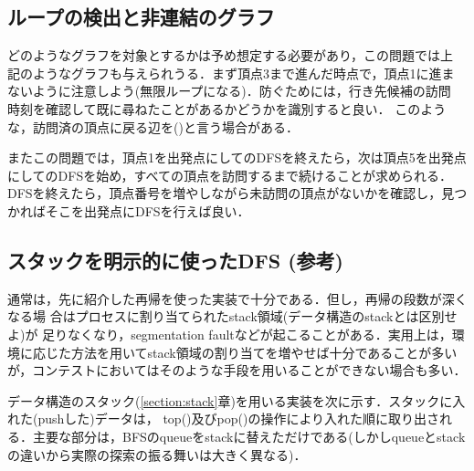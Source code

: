 \subsection*{ループの検出と非連結のグラフ}
\begin{center}
\end{center}

どのようなグラフを対象とするかは予め想定する必要があり，この問題では上
記のようなグラフも与えられうる．まず頂点3まで進んだ時点で，頂点1に進ま
ないように注意しよう(無限ループになる)．防ぐためには，行き先候補の訪問
時刻を確認して既に尋ねたことがあるかどうかを識別すると良い．
このような，訪問済の頂点に戻る辺を()と言う場合がある．

またこの問題では，頂点1を出発点にしてのDFSを終えたら，次は頂点5を出発点にしてのDFSを始め，すべての頂点を訪問するまで続けることが求められる．DFSを終えたら，頂点番号を増やしながら未訪問の頂点がないかを確認し，見つかればそこを出発点にDFSを行えば良い．

\subsection*{スタックを明示的に使ったDFS (参考)}

通常は，先に紹介した再帰を使った実装で十分である．但し，再帰の段数が深くなる場
合はプロセスに割り当てられたstack領域(データ構造のstackとは区別せよ)が
足りなくなり，segmentation faultなどが起こることがある．実用上は，環境に応じた方法を用いてstack領域の割り当てを増やせば十分であることが多いが，コンテストにおいてはそのような手段を用いることができない場合も多い．

データ構造のスタック(\ref{section:stack}章)を用いる実装を次に示す．スタックに入れた(pushした)データは，
top()及びpop()の操作により入れた順に取り出される．主要な部分は，BFSのqueueをstackに替えただけである(しかしqueueとstackの違いから実際の探索の振る舞いは大きく異なる)．

